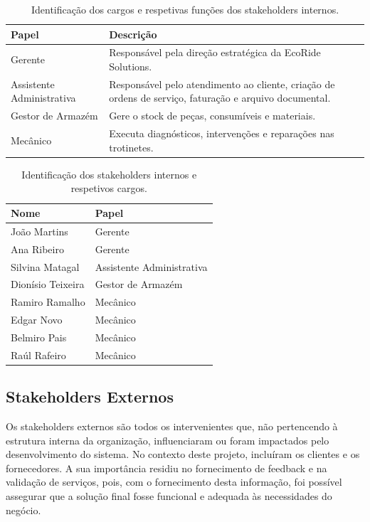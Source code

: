 \documentclass[a4paper,12pt]{scrreprt}
\begin{document}
	
\begin{table}[H]
	\centering
	\setlength{\arrayrulewidth}{0.6pt}
	\begin{tabular}{|p{5cm}|p{9cm}|}
		\hline
		\rowcolor{gray!20!white}
		\textbf{Papel} & \textbf{Descrição} \\
		\hline
		Gerente & Responsável pela direção estratégica da EcoRide Solutions. \\
		\hline
		Assistente Administrativa & Responsável pelo atendimento ao cliente, criação de ordens de serviço, faturação e arquivo documental. \\
		\hline
		Gestor de Armazém & Gere o stock de peças, consumíveis e materiais. \\
		\hline
		Mecânico & Executa diagnósticos, intervenções e reparações nas trotinetes. \\
		\hline
	\end{tabular}
	\caption{Identificação dos cargos e respetivas funções dos stakeholders internos.}
\end{table}

\begin{table}[H]
	\centering
	\setlength{\arrayrulewidth}{0.6pt}
	\begin{tabular}{|p{5cm}|p{9cm}|}
		\hline
		\rowcolor{gray!20!white}
		\textbf{Nome} & \textbf{Papel} \\
		\hline
		João Martins & Gerente \\
		\hline
		Ana Ribeiro & Gerente \\
		\hline
		Silvina Matagal & Assistente Administrativa \\
		\hline
		Dionísio Teixeira & Gestor de Armazém \\
		\hline
		Ramiro Ramalho & Mecânico \\
		\hline
		Edgar Novo & Mecânico \\
		\hline
		Belmiro Pais & Mecânico \\
		\hline
		Raúl Rafeiro & Mecânico \\
		\hline
	\end{tabular}
	\caption{Identificação dos stakeholders internos e respetivos cargos.}
\end{table}

\subsection{Stakeholders Externos}
Os stakeholders externos são todos os intervenientes que, não pertencendo à estrutura interna da organização, influenciaram ou foram impactados pelo desenvolvimento do sistema. No contexto deste projeto, incluíram os clientes e os fornecedores. A sua importância residiu no fornecimento de feedback e na validação de serviços, pois, com o fornecimento desta informação, foi possível assegurar que a solução final fosse funcional e adequada às necessidades do negócio.
\end{document}
